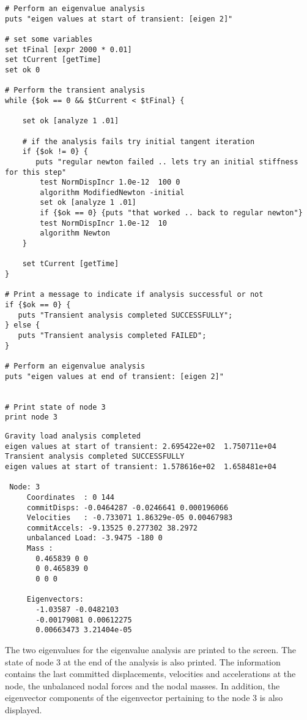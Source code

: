 \documentclass[12pt]{article}
\begin{document}
{\begin{verbatim}
# Perform an eigenvalue analysis
puts "eigen values at start of transient: [eigen 2]"

# set some variables
set tFinal [expr 2000 * 0.01]
set tCurrent [getTime]
set ok 0

# Perform the transient analysis
while {$ok == 0 && $tCurrent < $tFinal} {
    
    set ok [analyze 1 .01]
    
    # if the analysis fails try initial tangent iteration
    if {$ok != 0} {
       puts "regular newton failed .. lets try an initial stiffness for this step"
        test NormDispIncr 1.0e-12  100 0
        algorithm ModifiedNewton -initial
        set ok [analyze 1 .01]
        if {$ok == 0} {puts "that worked .. back to regular newton"}
        test NormDispIncr 1.0e-12  10 
        algorithm Newton
    }
    
    set tCurrent [getTime]
}

# Print a message to indicate if analysis successful or not
if {$ok == 0} {
   puts "Transient analysis completed SUCCESSFULLY";
} else {
   puts "Transient analysis completed FAILED";    
}

# Perform an eigenvalue analysis
puts "eigen values at end of transient: [eigen 2]"


# Print state of node 3
print node 3
\end{verbatim}
}


{\sf\small
\begin{verbatim}
Gravity load analysis completed
eigen values at start of transient: 2.695422e+02  1.750711e+04  
Transient analysis completed SUCCESSFULLY
eigen values at start of transient: 1.578616e+02  1.658481e+04  

 Node: 3
     Coordinates  : 0 144 
     commitDisps: -0.0464287 -0.0246641 0.000196066 
     Velocities   : -0.733071 1.86329e-05 0.00467983 
     commitAccels: -9.13525 0.277302 38.2972 
     unbalanced Load: -3.9475 -180 0 
     Mass : 
       0.465839 0 0 
       0 0.465839 0 
       0 0 0 

     Eigenvectors: 
       -1.03587 -0.0482103 
       -0.00179081 0.00612275 
       0.00663473 3.21404e-05 

\end{verbatim}
}

The two eigenvalues for the eigenvalue analysis are printed to the
screen. The state of node 3 at the end of the analysis is also
printed. 
The information contains the last committed displacements,
velocities and accelerations at the node, the unbalanced nodal forces
and the nodal masses. In addition, the eigenvector components of the
eigenvector pertaining to the node 3 is also displayed.
\end{document}
